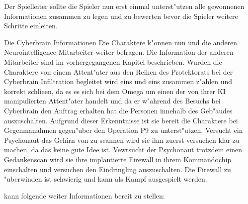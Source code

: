 Der Spielleiter sollte die Spieler nun erst einmal unterst"utzen alle gewonnenen Informationen zusammen zu legen und zu bewerten bevor die Spieler weitere Schritte einleiten. 

\underline{Die Cyberbrain Informationen} Die Charaktere k"onnen nun \ml{} und die anderen Neurointelligence Mitarbeiter weiter befragen. Die Information der anderen Mitarbeiter sind im vorhergegangenen Kapitel beschrieben.  Wurden die Charaktere von einem Attent"ater aus den Reihen des Protektorats bei der Cyberbrain Infiltration begleitet wird \ml{} eins und eins zusammen z"ahlen und korrekt schlie\3en, da\3 es es sich bei dem Omega um einen der von ihrer KI manipulierten Attent"ater handelt und da\3 er w"ahrend des Besuchs bei Cyberbrain den Auftrag erhalten hat die Personen innehalb des Geb"audes auszuschalten. Aufgrund dieser Erkenntnisse ist sie bereit die Charaktere bei Gegenma\3nahmen gegen"uber den Operation P9 zu unterst"utzen. Versucht ein Psychonaut das Gehirn von \ml{} zu scannen wird sie ihm zuerst versuchen klar zu machen, da\3 das keine gute Idee ist. Vewrsucht der Psychonaut trotzdem einen Gedankenscan wird sie ihre implantierte Firewall in ihrem Kommandochip einschalten und versuchen den Eindringling auszuschalten. Die Firewall zu "uberwinden ist schwierig und kann als Kampf ausgespielt werden.

\ml{} kann folgende weiter Informationen bereit zu stellen:

